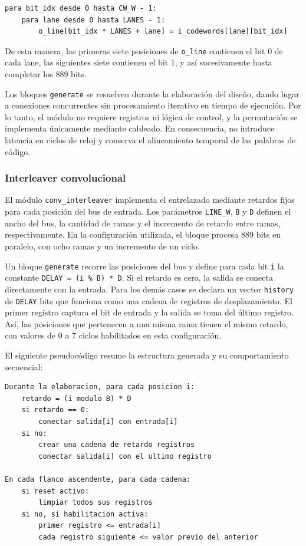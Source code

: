 \documentclass[10pt,a4paper]{article}
\begin{document}
\begin{lstlisting}[basicstyle=\ttfamily\small]
para bit_idx desde 0 hasta CW_W - 1:
    para lane desde 0 hasta LANES - 1:
        o_line[bit_idx * LANES + lane] = i_codewords[lane][bit_idx]
\end{lstlisting}

De esta manera, las primeras siete posiciones de \texttt{o\_line}
contienen el bit 0 de cada lane, las siguientes siete contienen
el bit 1, y así sucesivamente hasta completar los 889 bits.

Los bloques \texttt{generate} se resuelven durante la elaboración
del diseño, dando lugar a conexiones concurrentes sin procesamiento
iterativo en tiempo de ejecución. Por lo tanto, el módulo no
requiere registros ni lógica de control, y la permutación se
implementa únicamente mediante cableado. En consecuencia, no
introduce latencia en ciclos de reloj y conserva el alineamiento
temporal de las palabras de código.

\subsubsection{Interleaver convolucional}

El módulo \texttt{conv\_interleaver} implementa el entrelazado mediante
retardos fijos para cada posición del bus de entrada. Los parámetros
\texttt{LINE\_W}, \texttt{B} y \texttt{D} definen el ancho del bus,
la cantidad de ramas y el incremento de retardo entre ramas,
respectivamente. En la configuración utilizada, el bloque procesa
889 bits en paralelo, con ocho ramas y un incremento de un ciclo.

Un bloque \texttt{generate} recorre las posiciones del bus y define
para cada bit \texttt{i} la constante
\texttt{DELAY = (i \% B) * D}. Si el retardo es cero, la salida se
conecta directamente con la entrada. Para los demás casos se declara
un vector \texttt{history} de \texttt{DELAY} bits que funciona como una
cadena de registros de desplazamiento. El primer registro captura el
bit de entrada y la salida se toma del último registro. Así, las
posiciones que pertenecen a una misma rama tienen el mismo retardo,
con valores de 0 a 7 ciclos habilitados en esta configuración.

El siguiente pseudocódigo resume la estructura generada y su
comportamiento secuencial:

\begin{lstlisting}[basicstyle=\ttfamily\small]
Durante la elaboracion, para cada posicion i:
    retardo = (i modulo B) * D
    si retardo == 0:
        conectar salida[i] con entrada[i]
    si no:
        crear una cadena de retardo registros
        conectar salida[i] con el ultimo registro

En cada flanco ascendente, para cada cadena:
    si reset activo:
        limpiar todos sus registros
    si no, si habilitacion activa:
        primer registro <= entrada[i]
        cada registro siguiente <= valor previo del anterior
\end{lstlisting}
\end{document}
